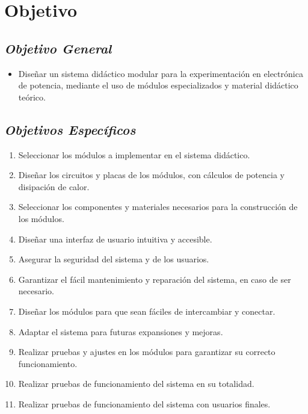 \section*{Objetivo}
\justifying

\subsection*{\it{Objetivo General}}
\begin{itemize}
    \item Diseñar un sistema didáctico modular para la experimentación en electrónica de potencia,
    mediante el uso de módulos especializados y material didáctico teórico.
\end{itemize}

\subsection*{\it{Objetivos Específicos}}
\begin{enumerate}[noitemsep]
    \item Seleccionar los módulos a implementar en el sistema didáctico.
    \item Diseñar los circuitos y placas de los módulos, con cálculos de potencia y disipación de calor.
    \item Seleccionar los componentes y materiales necesarios para la construcción de los módulos.
    \item Diseñar una interfaz de usuario intuitiva y accesible.
    \item Asegurar la seguridad del sistema y de los usuarios.
    \item Garantizar el fácil mantenimiento y reparación del sistema, en caso de ser necesario.
    \item Diseñar los módulos para que sean fáciles de intercambiar y conectar.
    \item Adaptar el sistema para futuras expansiones y mejoras.
    \item Realizar pruebas y ajustes en los módulos para garantizar su correcto funcionamiento.
    \item Realizar pruebas de funcionamiento del sistema en su totalidad.
    \item Realizar pruebas de funcionamiento del sistema con usuarios finales.
\end{enumerate}